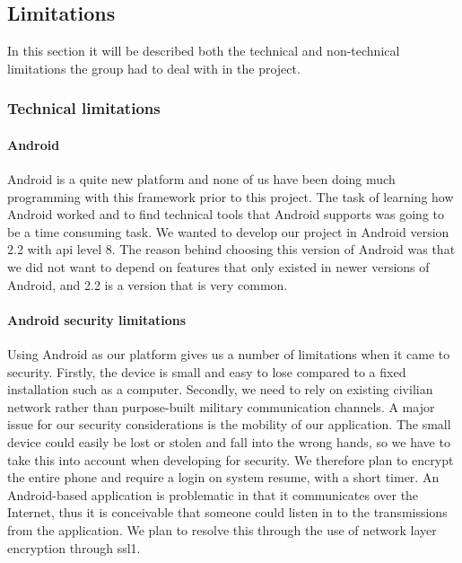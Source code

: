 \subsection{Limitations}

In this section it will be described both the technical and non-technical limitations the group had to deal with in the project.

\subsubsection{Technical limitations}

\paragraph{Android}\hfill
\newline
Android is a quite new platform and none of us have been doing much programming with this framework prior to this project. The task of learning how Android worked and to find technical tools that Android supports was going to be a time consuming task. We wanted to develop our project in Android version 2.2 with \gls{api} level 8. The reason behind choosing this version of Android was that we did not want to depend on features that only existed in newer versions of Android, and 2.2 is a version that is very common.

\newpage

\paragraph{Android security limitations}\hfill
\newline
Using Android as our platform gives us a number of limitations when it came to security. Firstly, the device is small and easy to lose compared to a fixed installation such as a computer. Secondly, we need to rely on existing civilian network rather than purpose-built military communication channels.
\newline
\newline
A major issue for our security considerations is the mobility of our application. The small device could easily be lost or stolen and fall into the wrong hands, so we have to take this into account when developing for security. We therefore plan to encrypt the entire phone and require a login on system resume, with a short timer.
\newline
\newline
An Android-based application is problematic in that it communicates over the Internet, thus it is conceivable that someone could listen in to the transmissions from the application. We plan to resolve this through the use of network layer encryption through \gls{ssl1}. 

